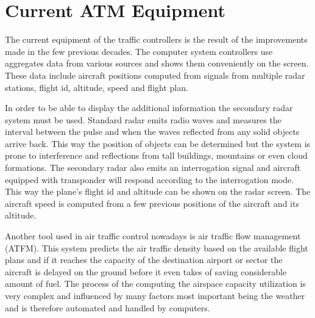 \section{Current ATM Equipment}

The current equipment of the traffic controllers is the result of the improvements made in the few previous decades. The computer system controllers use aggregates data from various sources and shows them conveniently on the screen. These data include aircraft positions computed from signals from multiple radar stations, flight id, altitude, speed and flight plan.

In order to be able to display the additional information the secondary radar system must be used.\cite{nolan} Standard radar emits radio waves and measures the interval between the pulse and when the waves reflected from any solid objects arrive back. This way the position of objects can be determined but the system is prone to interference and reflections from tall buildings, mountains or even cloud formations. The secondary radar also emits an interrogation signal and aircraft equipped with transponder will respond according to the interrogation mode. This way the plane's flight id and altitude can be shown on the radar screen. The aircraft speed is computed from a few previous positions of the aircraft and its altitude.

Another tool used in air traffic control nowadays is air traffic flow management (ATFM). This system predicts the air traffic density based on the available flight plans and if it reaches the capacity of the destination airport or sector the aircraft is delayed on the ground before it even takes of saving considerable amount of fuel. The process of the computing the airspace capacity utilization is very complex and influenced by many factors most important being the weather and is therefore automated and handled by computers.